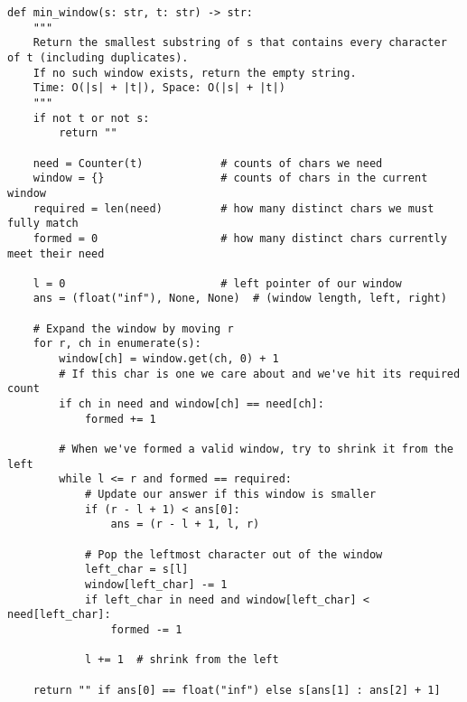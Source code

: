 \begin{verbatim}
def min_window(s: str, t: str) -> str:
    """
    Return the smallest substring of s that contains every character of t (including duplicates).
    If no such window exists, return the empty string.
    Time: O(|s| + |t|), Space: O(|s| + |t|)
    """
    if not t or not s:
        return ""

    need = Counter(t)            # counts of chars we need
    window = {}                  # counts of chars in the current window
    required = len(need)         # how many distinct chars we must fully match
    formed = 0                   # how many distinct chars currently meet their need

    l = 0                        # left pointer of our window
    ans = (float("inf"), None, None)  # (window length, left, right)

    # Expand the window by moving r
    for r, ch in enumerate(s):
        window[ch] = window.get(ch, 0) + 1
        # If this char is one we care about and we've hit its required count
        if ch in need and window[ch] == need[ch]:
            formed += 1

        # When we've formed a valid window, try to shrink it from the left
        while l <= r and formed == required:
            # Update our answer if this window is smaller
            if (r - l + 1) < ans[0]:
                ans = (r - l + 1, l, r)

            # Pop the leftmost character out of the window
            left_char = s[l]
            window[left_char] -= 1
            if left_char in need and window[left_char] < need[left_char]:
                formed -= 1

            l += 1  # shrink from the left

    return "" if ans[0] == float("inf") else s[ans[1] : ans[2] + 1]

\end{verbatim}
% 

